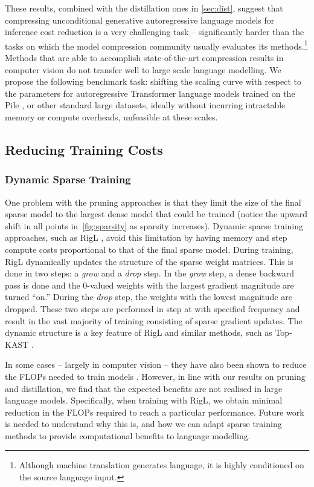 \documentclass[11pt, a4paper, logo, internal, copyright, nonumbering]{deepmind}
\begin{document}
These results, combined with the distillation ones in \autoref{sec:dist}, suggest that compressing unconditional generative autoregressive language models for inference cost reduction is a very challenging task -- significantly harder than the tasks on which the model compression community usually evaluates its methods.\footnote{Although machine translation generates language, it is highly conditioned on the source language input.} Methods that are able to accomplish state-of-the-art compression results in computer vision do not transfer well to large scale language modelling.
We propose the following benchmark task: 
shifting the scaling curve with respect to the parameters for autoregressive Transformer language models trained on the Pile \citep{pile},
or other standard large datasets, ideally without incurring intractable memory or compute overheads, unfeasible at these scales.

\subsection{Reducing Training Costs}
\label{sec:training-cost}

\subsubsection{Dynamic Sparse Training}
One problem with the pruning approaches is that they limit the size of the final sparse model to the largest dense model that could be trained (notice the upward shift in all points in~\autoref{fig:sparsity} as sparsity increases). 
Dynamic sparse training approaches, such as RigL \citep{evci2020rigging}, avoid this limitation by having memory and step compute costs proportional to that of the final sparse model.
During training, RigL \citep{evci2020rigging} dynamically updates the structure of the sparse weight matrices. 
This is done in two steps: a \textit{grow} and a \textit{drop} step. 
In the \textit{grow} step, a dense backward pass is done and the 0-valued weights with the largest gradient magnitude are turned ``on.'' During the \textit{drop} step, the weights with the lowest magnitude are dropped. 
These two steps are performed in step at with specified frequency and result in the vast majority of training consisting of sparse gradient updates.
The dynamic structure is a key feature of RigL and similar methods, such as Top-KAST \citep{jayakumar2021top}.

In some cases -- largely in computer vision -- they have also been shown to reduce the FLOPs needed to train models \citep{evci2020rigging, jayakumar2021top}.
However, in line with our results on pruning and distillation, we find that the expected benefits are not realised in large language models. 
Specifically, when training with RigL, we obtain minimal reduction in the FLOPs required to reach a particular performance.
Future work is needed to understand why this is, and how we can adapt sparse training methods to provide computational benefits to language modelling.
\end{document}
